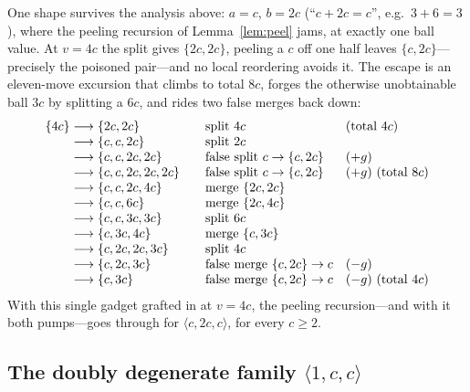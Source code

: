 \documentclass[11pt]{article}
\theoremstyle{definition}
\theoremstyle{remark}
\newcommand{\lie}[3]{\langle #1,#2,#3\rangle}
\newcommand{\ms}[1]{\{#1\}}
\newcommand{\move}{\longrightarrow}
\begin{document}
One shape survives the analysis above: $a=c$, $b=2c$ (``$c+2c=c$'', e.g.\
$3+6=3$), where the peeling recursion of Lemma~\ref{lem:peel} jams, at
exactly one ball value.  At $v=4c$ the split gives $\{2c,2c\}$, peeling a
$c$ off one half leaves $\{c,2c\}$---precisely the poisoned pair---and no
local reordering avoids it.  The escape is an eleven-move excursion that
climbs to total $8c$, forges the otherwise unobtainable ball $3c$ by
splitting a $6c$, and rides two false merges back down:
\[
\begin{array}{r@{\;}c@{\;}l@{\qquad}ll}
\ms{4c} &\move& \ms{2c,2c} & \text{split $4c$} & \text{(total $4c$)}\\
        &\move& \ms{c,c,2c} & \text{split $2c$} \\
        &\move& \ms{c,c,2c,2c} & \text{false split } c\to\{c,2c\} & (+g) \\
        &\move& \ms{c,c,2c,2c,2c} & \text{false split } c\to\{c,2c\} & (+g)\ \text{(total $8c$)} \\
        &\move& \ms{c,c,2c,4c} & \text{merge }\{2c,2c\} \\
        &\move& \ms{c,c,6c} & \text{merge }\{2c,4c\} \\
        &\move& \ms{c,c,3c,3c} & \text{split } 6c \\
        &\move& \ms{c,3c,4c} & \text{merge }\{c,3c\} \\
        &\move& \ms{c,2c,2c,3c} & \text{split } 4c \\
        &\move& \ms{c,2c,3c} & \text{false merge }\{c,2c\}\to c & (-g) \\
        &\move& \ms{c,3c} & \text{false merge }\{c,2c\}\to c & (-g)\ \text{(total $4c$)}
\end{array}
\]
With this single gadget grafted in at $v=4c$, the peeling recursion---and
with it both pumps---goes through for $\lie{c}{2c}{c}$, for every $c\ge 2$.

\subsection{The doubly degenerate family \texorpdfstring{$\lie{1}{c}{c}$}{(1,c,c)}}
\label{sec:onecc}
\end{document}
